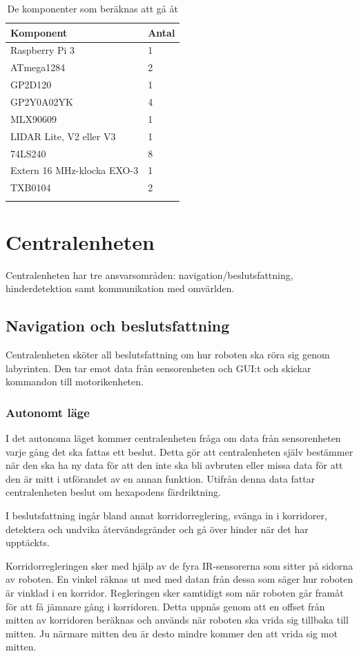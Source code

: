 \documentclass[a4paper,titlepage,12pt]{article}
\begin{document}
	\begin{longtable}[c]{l l}
		\textbf{Komponent} & \textbf{Antal} \\ \midrule
		Raspberry Pi 3 & 1 \\
		ATmega1284 & 2 \\
		GP2D120 & 1 \\
		GP2Y0A02YK & 4 \\
		MLX90609 & 1 \\
		LIDAR Lite, V2 eller V3 & 1 \\
	    74LS240 & 8 \\
        Extern 16 MHz-klocka EXO-3 & 1 \\
        TXB0104 & 2 \\
        \caption{De komponenter som beräknas att gå åt \label{table:components}}
	\end{longtable}
	
    \newpage
	\section{Centralenheten}
	Centralenheten har tre ansvarsområden: navigation/beslutsfattning, hinderdetektion samt
	kommunikation med omvärlden.

	\subsection{Navigation och beslutsfattning}

	Centralenheten sköter all beslutsfattning om hur roboten ska röra sig
	genom labyrinten. Den tar emot data från sensorenheten och GUI:t och
	skickar kommandon till motorikenheten.
  
	\subsubsection{Autonomt läge}
	I det autonoma läget kommer centralenheten fråga om data från sensorenheten
    varje gång det ska fattas ett beslut. Detta gör att centralenheten själv
    bestämmer när den ska ha ny data för att den inte ska bli avbruten eller missa
    data för att den är mitt i utförandet av en annan funktion. Utifrån denna data
    fattar centralenheten beslut om hexapodens färdriktning.

    I beslutsfattning ingår bland annat korridorreglering, svänga in i korridorer, detektera
    och undvika återvändsgränder och gå över hinder när det har upptäckts.

    Korridorregleringen sker med hjälp av de fyra IR-sensorerna som sitter på
    sidorna av roboten. En vinkel räknas ut med med datan från dessa som säger
    hur roboten är vinklad i en korridor. Regleringen sker samtidigt som när
    roboten går framåt för att få jämnare gång i korridoren. Detta uppnås genom
    att en offset från mitten av korridoren beräknas och används när roboten ska
    vrida sig tillbaka till mitten. Ju närmare mitten den är desto mindre kommer
    den att vrida sig mot mitten.
\end{document}
